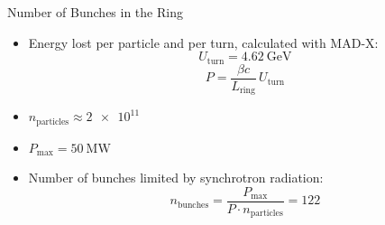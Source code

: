 \documentclass{beamer}
\begin{document}
\begin{frame}[t,fragile]{Number of Bunches in the Ring}
\begin{itemize}
   \item Energy lost per particle and per turn, calculated with MAD-X:
      \begin{equation*}
         U_\text{turn}= \SI{4.62}{\GeV}
      \end{equation*}
\begin{equation*}
   P=\frac{\beta c}{L_{\textrm{ring}}}\,U_\text{turn}
\end{equation*}
   \item $n_\text{particles} \approx \num{2e11}$
   \item $P_\text{max} = \SI{50}{\mega\watt}$
   \item Number of bunches limited by synchrotron radiation:
\begin{equation*}
n_\text{bunches} = \frac{P_\text{max}}{P\cdot n_\text{particles}} = 122
\end{equation*}
\end{itemize}
\end{frame}
\end{document}
